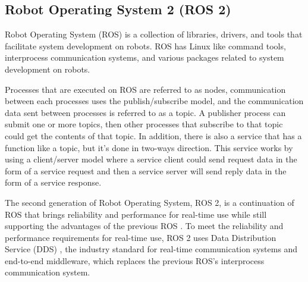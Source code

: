 
\subsection{Robot Operating System 2 (ROS 2)}
\label{subsec:ros2}

Robot Operating System (ROS) \citep{quigley2009} is a collection of libraries, drivers,
  and tools that facilitate system development on robots.
ROS has Linux like command tools,
  interprocess communication systems, and various packages related to system development on robots.

Processes that are executed on ROS are referred to as nodes,
  communication between each processes uses the publish/subscribe model,
  and the communication data sent between processes is referred to as a topic.
A publisher process can submit one or more topics,
  then other processes that subscribe to that topic could get the contents of that topic.
In addition, there is also a service that has a function like a topic,
  but it's done in two-ways direction.
This service works by using a client/server model where a service client could send request data in the form of a service request and then a service server will send reply data in the form of a service response.

The second generation of Robot Operating System, ROS 2,
  is a continuation of ROS that brings reliability and performance for real-time use while still supporting the advantages of the previous ROS \citep{maruyama2016}.
To meet the reliability and performance requirements for real-time use,
  ROS 2 uses Data Distribution Service (DDS) \citep{castellote2003} \citep{schlesselman2004},
  the industry standard for real-time communication systems and end-to-end middleware,
  which replaces the previous ROS's interprocess communication system.
